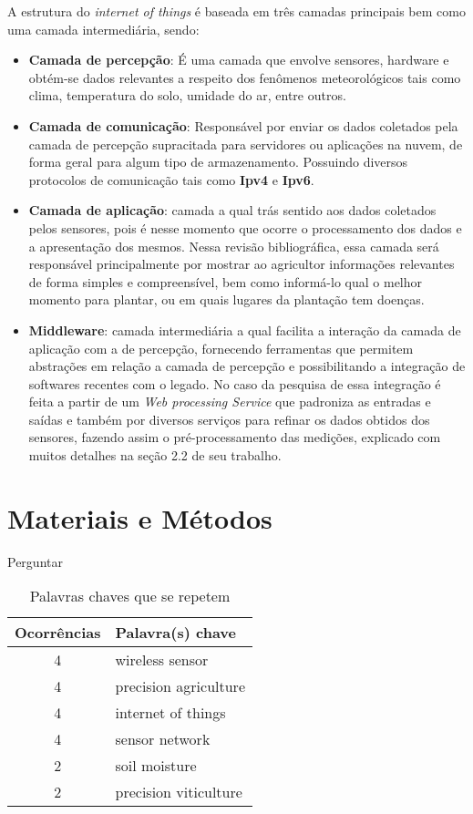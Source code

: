 \documentclass[
article,			%
12pt,				%
oneside,			%
a4paper,			%
english,			%
brazil,				%
sumario=tradicional
]{abntex2}
\begin{document}
A estrutura do \textit{internet of things} é baseada em três camadas\cite{5} principais bem como uma camada intermediária, sendo:
  \begin{itemize}
      \item \textbf{Camada de percepção}: É uma camada que envolve sensores, hardware e obtém-se dados relevantes a respeito dos fenômenos meteorológicos tais como clima, temperatura do solo, umidade do ar, entre outros.
      \item \textbf{Camada de comunicação}: Responsável por enviar os dados coletados pela camada de percepção supracitada para servidores ou aplicações na nuvem, de forma geral para algum tipo de armazenamento. Possuindo diversos protocolos de comunicação tais como \textbf{Ipv4} e \textbf{Ipv6}\cite{camada2}.
      \item \textbf{Camada de aplicação}: camada a qual trás sentido aos dados coletados pelos sensores, pois é nesse momento que ocorre o processamento dos dados e a apresentação dos mesmos. Nessa revisão bibliográfica, essa camada será responsável principalmente por mostrar ao agricultor informações relevantes de forma simples e compreensível, bem como informá-lo qual o melhor momento para plantar\cite{1}, ou em quais lugares da plantação tem doenças\cite{2}.
      \item \textbf{Middleware}: camada intermediária a qual facilita a interação da camada de aplicação com a de percepção\cite{5}, fornecendo ferramentas que permitem abstrações em relação a camada de percepção e possibilitando a integração de softwares recentes com o legado\cite{5}. No caso da pesquisa de \citeauthor{6} essa integração é feita a partir de um \textit{Web processing Service} que padroniza as entradas e saídas e também por diversos serviços para refinar os dados obtidos dos sensores, fazendo assim o pré-processamento das medições, explicado com muitos detalhes na seção 2.2 de seu trabalho.
      \end{itemize}

\section{Materiais e Métodos}\label{Materiais e Métodos}
Perguntar


\begin{table}[!htb]
  \centering
  \caption{Palavras chaves que se repetem}
  \begin{tabular}{|c|l|}
    \hline
    \textbf{Ocorrências} & \textbf{Palavra(s) chave} \\ \hline
    4                    & wireless sensor           \\ \hline
    4                    & precision agriculture     \\ \hline
    4                    & internet of things        \\ \hline
    4                    & sensor network            \\ \hline
    2                    & soil moisture             \\ \hline
    2                    & precision viticulture     \\ \hline
  \end{tabular}
\end{table}
\end{document}
